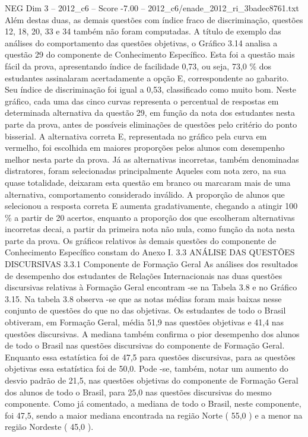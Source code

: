 \begin{textsample}{NEG Dim 3 – 2012\_c6 – Score -7.00 – 2012\_c6/enade\_2012\_ri\_3badec8761.txt}
Além destas duas, as demais questões com índice fraco de discriminação, questões 12, 18, 20, 33 e 34 também não foram computadas.
A título de exemplo das análises do comportamento das questões objetivas, o Gráfico 3.14 analisa a questão 29 do componente de Conhecimento Específico.
Esta foi a questão mais fácil da prova, apresentando índice de facilidade 0,73, ou seja, 73,0 \% dos estudantes assinalaram acertadamente a opção E, correspondente ao gabarito.
Seu índice de discriminação foi igual a 0,53, classificado como muito bom.
Neste gráfico, cada uma das cinco curvas representa o percentual de respostas em determinada alternativa da questão 29, em função da nota dos estudantes nesta parte da prova, antes de possíveis eliminações de questões pelo critério do ponto bisserial.
A alternativa correta E, representada no gráfico pela curva em vermelho, foi escolhida em maiores proporções pelos alunos com desempenho melhor nesta parte da prova.
Já as alternativas incorretas, também denominadas distratores, foram selecionadas principalmente Aqueles com nota zero, na sua quase totalidade, deixaram esta questão em branco ou marcaram mais de uma alternativa, comportamento considerado inválido.
A proporção de alunos que selecionou a resposta correta E aumenta gradativamente, chegando a atingir 100 \% a partir de 20 acertos, enquanto a proporção dos que escolheram alternativas incorretas decai, a partir da primeira nota não nula, como função da nota nesta parte da prova.
Os gráficos relativos às demais questões do componente de Conhecimento Específico constam do Anexo I. 3.3 ANÁLISE DAS QUESTÕES DISCURSIVAS 3.3.1 Componente de Formação Geral As análises dos resultados de desempenho dos estudantes de Relações Internacionais nas duas questões discursivas relativas à Formação Geral encontram -se na Tabela 3.8 e no Gráfico 3.15.
Na tabela 3.8 observa -se que as notas médias foram mais baixas nesse conjunto de questões do que no das objetivas.
Os estudantes de todo o Brasil obtiveram, em Formação Geral, média 51,9 nas questões objetivas e 41,4 nas questões discursivas.
A mediana também confirma o pior desempenho dos alunos de todo o Brasil nas questões discursivas do componente de Formação Geral.
Enquanto essa estatística foi de 47,5 para questões discursivas, para as questões objetivas essa estatística foi de 50,0.
Pode -se, também, notar um aumento do desvio padrão de 21,5, nas questões objetivas do componente de Formação Geral dos alunos de todo o Brasil, para 25,0 nas questões discursivas do mesmo componente.
Como já comentado, a mediana de todo o Brasil, neste componente, foi 47,5, sendo a maior mediana encontrada na região Norte ( 55,0 ) e a menor na região Nordeste ( 45,0 ).

\end{textsample}
